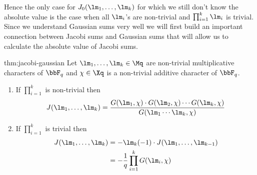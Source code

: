 Hence the only case for $J_0(\lm_1,\dots,\lm_k)$ for which we still don't know the absolute value is the case when all $\lm_i$'s are non-trivial and $\prod_{i=1}^k\lm_i$ is trivial. Since we understand Gaussian sums very well we will first build an important connection between Jacobi sums and Gaussian sums that will allow us to calculate the absolute value of Jacobi sums. 
\begin{Theorem}{}{thm:jacobi-gaussian}
  Let $\lm_1,\dots,\lm_k\in\Mq$ are non-trivial multiplicative characters of $\bbF_q$ and $\chi\in\Xq$ is a non-trivial additive character of $\bbF_q$.
  \begin{enumerate}[label=(\roman*)]
    \item If $\prod_{i=1}^k$ is non-trivial then$$J(\lm_1,\dots, \lm_k)=\frac{G(\lm_1,\chi)\cdot G(\lm_2,\chi)\cdots G(\lm_k,\chi)}{G(\lm_1\cdots \lm_k,\chi)}$$
    \item If $\prod_{i=1}^k$ is trivial then \begin{align*}
      J(\lm_1,\dots, \lm_k)& = -\lm_k(-1)\cdot J(\lm_1,\dots, \lm_{k-1})\\ 
      & = -\frac1q \prod_{i=1}^{k}G(\lm_i,\chi)
    \end{align*}
  \end{enumerate}
\end{Theorem}
